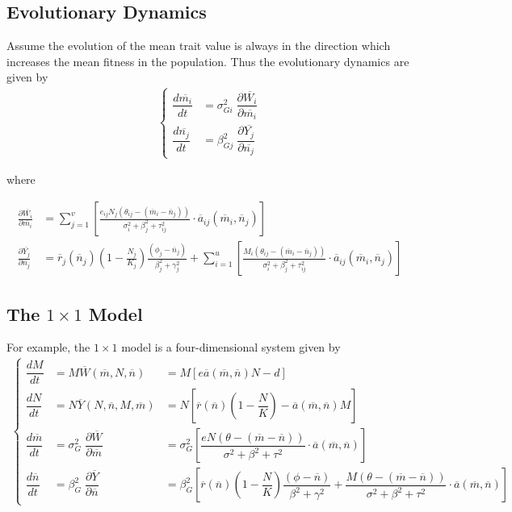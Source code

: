 \documentclass[12pt]{article}
\begin{document}
\subsection*{Evolutionary Dynamics}
\noindent Assume the evolution of the mean trait value is always in the direction which increases the mean fitness in the population.  Thus the evolutionary dynamics are given by
\begin{align}
	\begin{cases}
		\dfrac{d\overline{m_i}}{dt} &= \sigma_{Gi}^2 \; \dfrac{\partial \overline{W_i}}{\partial \overline{m_i}} \\[.25cm]
		\dfrac{d\overline{n_j}}{dt} &= \beta_{Gj}^2 \; \dfrac{\partial \overline{Y_j}}{\partial \overline{n_j}}
	\end{cases}
\end{align}

\noindent where

\begin{align*}
	\frac{\partial \overline{W_i}}{\partial \overline{m_i}} &= \sum_{j=1}^v\left[\frac{e_{ij}N_j(\theta_{ij} - (\overline{m}_i - \overline{n}_j))}{\sigma_i^2 + \beta_j^2 + \tau_{ij}^2} \cdot \overline{a}_{ij}(\overline{m}_i, \overline{n}_j)\right]\\
	\frac{\partial \overline{Y_j}}{\partial \overline{n_j}} &= \overline{r}_j(\overline{n}_j)\left(1 - \frac{N_j}{K_j}\right)\frac{(\phi_j - \overline{n}_j)}{\beta_j^2 + \gamma_j^2} + \sum_{i=1}^u\left[\frac{M_i(\theta_{ij} - (\overline{m}_i - \overline{n}_j))}{\sigma_i^2 + \beta_j^2 + \tau_{ij}^2} \cdot \overline{a}_{ij}(\overline{m}_i, \overline{n}_j)\right]
\end{align*}

\subsection*{The $1\times1$ Model}
\noindent For example, the $1\times1$ model is a four-dimensional system given by
\begin{align*}
	\left\{\begin{array}{lll}
		\dfrac{dM}{dt} &= M \overline{W}(\overline{m}, N, \overline{n}) &= M \left[e\overline{a}(\overline{m}, \overline{n})N - d\right] \\[.5cm]
		\dfrac{dN}{dt} &= N \overline{Y}(N, \overline{n}, M, \overline{m}) &= N \left[\overline{r}(\overline{n}) \left(1 - \dfrac{N}{K} \right) - \overline{a}(\overline{m}, \overline{n}) M\right] \\[.5cm]
		\dfrac{d\overline{m}}{dt} &= \sigma_{G}^2 \; \dfrac{\partial \overline{W}}{\partial \overline{m}} &= \sigma_{G}^2 \left[\dfrac{eN(\theta - (\overline{m} - \overline{n}))}{\sigma^2 + \beta^2 + \tau^2} \cdot \overline{a}(\overline{m}, \overline{n})\right]\\[.5cm]
		\dfrac{d\overline{n}}{dt} &= \beta_{G}^2 \; \dfrac{\partial \overline{Y}}{\partial \overline{n}} &= \beta_{G}^2 \left[\overline{r}(\overline{n})\left(1 - \dfrac{N}{K}\right)\dfrac{(\phi - \overline{n})}{\beta^2 + \gamma^2} + \dfrac{M(\theta - (\overline{m} - \overline{n}))}{\sigma^2 + \beta^2 + \tau^2} \cdot \overline{a}(\overline{m}, \overline{n})\right]
	\end{array}\right.
\end{align*}
\end{document}
